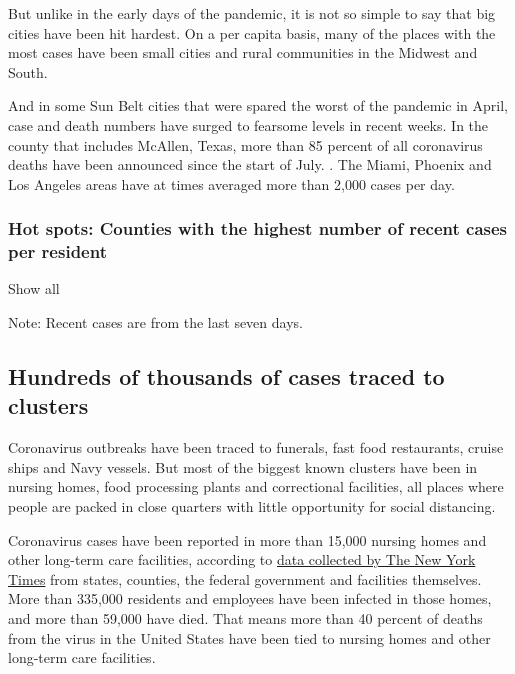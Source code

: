 But unlike in the early days of the pandemic, it is not so simple to say
that big cities have been hit hardest. On a per capita basis, many of
the places with the most cases have been small cities and rural
communities in the Midwest and South.

And in some Sun Belt cities that were spared the worst of the pandemic
in April, case and death numbers have surged to fearsome levels in
recent weeks. In the county that includes McAllen, Texas, more than 85
percent of all coronavirus deaths have been announced since the start of
July. . The Miami, Phoenix and Los Angeles areas have at times averaged
more than 2,000 cases per day.

\hypertarget{hot-spots-counties-with-the-highest-number-of-recent-cases-per-resident}{%
\subsubsection{Hot spots: Counties with the highest number of recent
cases per
resident}\label{hot-spots-counties-with-the-highest-number-of-recent-cases-per-resident}}

Show all

Note: Recent cases are from the last seven days.

\hypertarget{hundreds-of-thousands-of-cases-traced-to-clusters}{%
\subsection{Hundreds of thousands of cases traced to
clusters}\label{hundreds-of-thousands-of-cases-traced-to-clusters}}

Coronavirus outbreaks have been traced to funerals, fast food
restaurants, cruise ships and Navy vessels. But most of the biggest
known clusters have been in nursing homes, food processing plants and
correctional facilities, all places where people are packed in close
quarters with little opportunity for social distancing.

Coronavirus cases have been reported in more than 15,000 nursing homes
and other long-term care facilities, according to
\href{https://www.nytimes3xbfgragh.onion/interactive/2020/us/coronavirus-nursing-homes.html}{data
collected by The New York Times} from states, counties, the federal
government and facilities themselves. More than 335,000 residents and
employees have been infected in those homes, and more than 59,000 have
died. That means more than 40 percent of deaths from the virus in the
United States have been tied to nursing homes and other long-term care
facilities.

